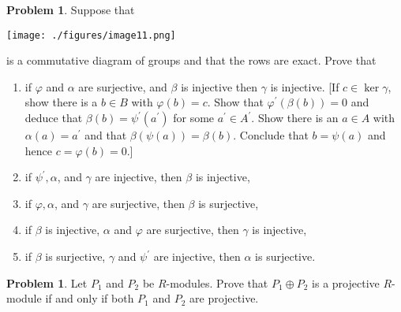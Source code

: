 \documentclass{amsart}
\numberwithin{equation}{section}
\theoremstyle{definition}
\newtheorem{problem}[thm]{Problem}
\begin{document}
\begin{problem}
 Suppose that
 \begin{center}
  \texttt{[image: ./figures/image11.png]}
\end{center}
is a commutative diagram of groups and that the rows are exact. Prove that
\begin{enumerate}
\item if \(\varphi\) and \(\alpha\) are surjective, and \(\beta\) is injective then \(\gamma\) is injective. [If \(c \in \operatorname{ker} \gamma\), show there is a \(b \in B\) with \(\varphi(b)=c\). Show that \(\varphi^{\prime}(\beta(b))=0\) and deduce that \(\beta(b)=\psi^{\prime}\left(a^{\prime}\right)\) for some \(a^{\prime} \in A^{\prime}\). Show there is an \(a \in A\) with \(\alpha(a)=a^{\prime}\) and that \(\beta(\psi(a))=\beta(b)\). Conclude that \(b=\psi(a)\) and hence \(c=\varphi(b)=0\).]
\item if \(\psi^{\prime}, \alpha\), and \(\gamma\) are injective, then \(\beta\) is injective,
\item if \(\varphi, \alpha\), and \(\gamma\) are surjective, then \(\beta\) is surjective,
\item if \(\beta\) is injective, \(\alpha\) and \(\varphi\) are surjective, then \(\gamma\) is injective,
\item if \(\beta\) is surjective, \(\gamma\) and \(\psi^{\prime}\) are injective, then \(\alpha\) is surjective.
\end{enumerate}
\end{problem}






\begin{problem}
   Let \(P_1\) and \(P_2\) be \(R\)-modules. Prove that \(P_1 \oplus P_2\) is a projective \(R\)-module if and only if both \(P_1\) and \(P_2\) are projective.
\end{problem}
\end{document}
